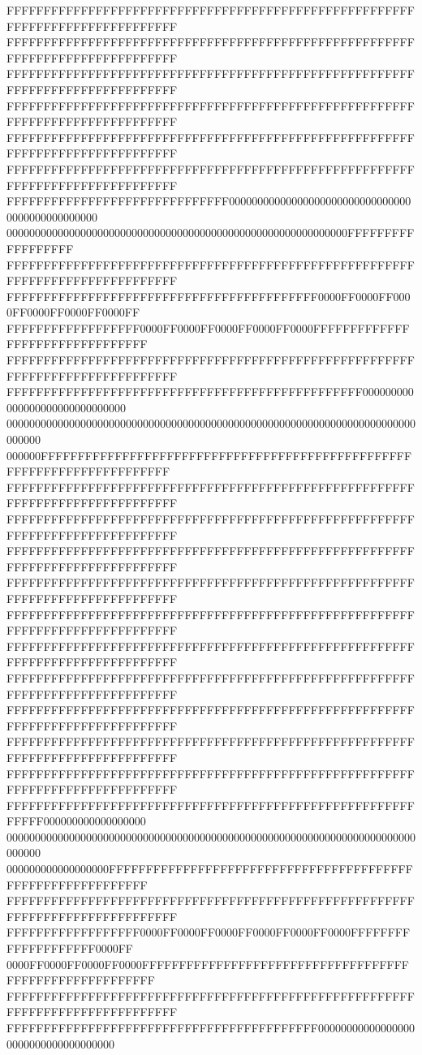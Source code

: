FFFFFFFFFFFFFFFFFFFFFFFFFFFFFFFFFFFFFFFFFFFFFFFFFFFFFFFFFFFFFFFFFFFFFFFFFFFFFF
FFFFFFFFFFFFFFFFFFFFFFFFFFFFFFFFFFFFFFFFFFFFFFFFFFFFFFFFFFFFFFFFFFFFFFFFFFFFFF
FFFFFFFFFFFFFFFFFFFFFFFFFFFFFFFFFFFFFFFFFFFFFFFFFFFFFFFFFFFFFFFFFFFFFFFFFFFFFF
FFFFFFFFFFFFFFFFFFFFFFFFFFFFFFFFFFFFFFFFFFFFFFFFFFFFFFFFFFFFFFFFFFFFFFFFFFFFFF
FFFFFFFFFFFFFFFFFFFFFFFFFFFFFFFFFFFFFFFFFFFFFFFFFFFFFFFFFFFFFFFFFFFFFFFFFFFFFF
FFFFFFFFFFFFFFFFFFFFFFFFFFFFFFFFFFFFFFFFFFFFFFFFFFFFFFFFFFFFFFFFFFFFFFFFFFFFFF
FFFFFFFFFFFFFFFFFFFFFFFFFFFFFF000000000000000000000000000000000000000000000000
000000000000000000000000000000000000000000000000000000000000FFFFFFFFFFFFFFFFFF
FFFFFFFFFFFFFFFFFFFFFFFFFFFFFFFFFFFFFFFFFFFFFFFFFFFFFFFFFFFFFFFFFFFFFFFFFFFFFF
FFFFFFFFFFFFFFFFFFFFFFFFFFFFFFFFFFFFFFFFFF0000FF0000FF0000FF0000FF0000FF0000FF
FFFFFFFFFFFFFFFFFF0000FF0000FF0000FF0000FF0000FFFFFFFFFFFFFFFFFFFFFFFFFFFFFFFF
FFFFFFFFFFFFFFFFFFFFFFFFFFFFFFFFFFFFFFFFFFFFFFFFFFFFFFFFFFFFFFFFFFFFFFFFFFFFFF
FFFFFFFFFFFFFFFFFFFFFFFFFFFFFFFFFFFFFFFFFFFFFFFF000000000000000000000000000000
000000000000000000000000000000000000000000000000000000000000000000000000000000
000000FFFFFFFFFFFFFFFFFFFFFFFFFFFFFFFFFFFFFFFFFFFFFFFFFFFFFFFFFFFFFFFFFFFFFFFF
FFFFFFFFFFFFFFFFFFFFFFFFFFFFFFFFFFFFFFFFFFFFFFFFFFFFFFFFFFFFFFFFFFFFFFFFFFFFFF
FFFFFFFFFFFFFFFFFFFFFFFFFFFFFFFFFFFFFFFFFFFFFFFFFFFFFFFFFFFFFFFFFFFFFFFFFFFFFF
FFFFFFFFFFFFFFFFFFFFFFFFFFFFFFFFFFFFFFFFFFFFFFFFFFFFFFFFFFFFFFFFFFFFFFFFFFFFFF
FFFFFFFFFFFFFFFFFFFFFFFFFFFFFFFFFFFFFFFFFFFFFFFFFFFFFFFFFFFFFFFFFFFFFFFFFFFFFF
FFFFFFFFFFFFFFFFFFFFFFFFFFFFFFFFFFFFFFFFFFFFFFFFFFFFFFFFFFFFFFFFFFFFFFFFFFFFFF
FFFFFFFFFFFFFFFFFFFFFFFFFFFFFFFFFFFFFFFFFFFFFFFFFFFFFFFFFFFFFFFFFFFFFFFFFFFFFF
FFFFFFFFFFFFFFFFFFFFFFFFFFFFFFFFFFFFFFFFFFFFFFFFFFFFFFFFFFFFFFFFFFFFFFFFFFFFFF
FFFFFFFFFFFFFFFFFFFFFFFFFFFFFFFFFFFFFFFFFFFFFFFFFFFFFFFFFFFFFFFFFFFFFFFFFFFFFF
FFFFFFFFFFFFFFFFFFFFFFFFFFFFFFFFFFFFFFFFFFFFFFFFFFFFFFFFFFFFFFFFFFFFFFFFFFFFFF
FFFFFFFFFFFFFFFFFFFFFFFFFFFFFFFFFFFFFFFFFFFFFFFFFFFFFFFFFFFFFFFFFFFFFFFFFFFFFF
FFFFFFFFFFFFFFFFFFFFFFFFFFFFFFFFFFFFFFFFFFFFFFFFFFFFFFFFFFFF000000000000000000
000000000000000000000000000000000000000000000000000000000000000000000000000000
000000000000000000FFFFFFFFFFFFFFFFFFFFFFFFFFFFFFFFFFFFFFFFFFFFFFFFFFFFFFFFFFFF
FFFFFFFFFFFFFFFFFFFFFFFFFFFFFFFFFFFFFFFFFFFFFFFFFFFFFFFFFFFFFFFFFFFFFFFFFFFFFF
FFFFFFFFFFFFFFFFFF0000FF0000FF0000FF0000FF0000FF0000FFFFFFFFFFFFFFFFFFFF0000FF
0000FF0000FF0000FF0000FFFFFFFFFFFFFFFFFFFFFFFFFFFFFFFFFFFFFFFFFFFFFFFFFFFFFFFF
FFFFFFFFFFFFFFFFFFFFFFFFFFFFFFFFFFFFFFFFFFFFFFFFFFFFFFFFFFFFFFFFFFFFFFFFFFFFFF
FFFFFFFFFFFFFFFFFFFFFFFFFFFFFFFFFFFFFFFFFF000000000000000000000000000000000000
